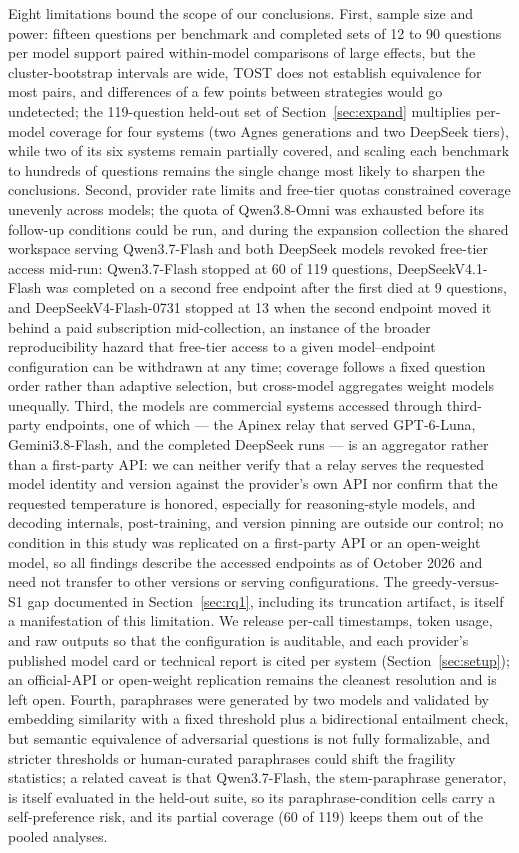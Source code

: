 Eight limitations bound the scope of our conclusions. First, sample size and power: fifteen questions per benchmark and completed sets of 12 to 90 questions per model support paired within-model comparisons of large effects, but the cluster-bootstrap intervals are wide, TOST does not establish equivalence for most pairs, and differences of a few points between strategies would go undetected; the 119-question held-out set of Section~\ref{sec:expand} multiplies per-model coverage for four systems (two Agnes generations and two DeepSeek tiers), while two of its six systems remain partially covered, and scaling each benchmark to hundreds of questions remains the single change most likely to sharpen the conclusions. Second, provider rate limits and free-tier quotas constrained coverage unevenly across models; the quota of Qwen3.8-Omni was exhausted before its follow-up conditions could be run, and during the expansion collection the shared workspace serving Qwen3.7-Flash and both DeepSeek models revoked free-tier access mid-run: Qwen3.7-Flash stopped at 60 of 119 questions, DeepSeekV4.1-Flash was completed on a second free endpoint after the first died at 9 questions, and DeepSeekV4-Flash-0731 stopped at 13 when the second endpoint moved it behind a paid subscription mid-collection, an instance of the broader reproducibility hazard that free-tier access to a given model--endpoint configuration can be withdrawn at any time; coverage follows a fixed question order rather than adaptive selection, but cross-model aggregates weight models unequally. Third, the models are commercial systems accessed through third-party endpoints, one of which --- the Apinex relay that served GPT-6-Luna, Gemini3.8-Flash, and the completed DeepSeek runs --- is an aggregator rather than a first-party API: we can neither verify that a relay serves the requested model identity and version against the provider's own API nor confirm that the requested temperature is honored, especially for reasoning-style models, and decoding internals, post-training, and version pinning are outside our control; no condition in this study was replicated on a first-party API or an open-weight model, so all findings describe the accessed endpoints as of October 2026 and need not transfer to other versions or serving configurations. The greedy-versus-S1 gap documented in Section~\ref{sec:rq1}, including its truncation artifact, is itself a manifestation of this limitation. We release per-call timestamps, token usage, and raw outputs so that the configuration is auditable, and each provider's published model card or technical report is cited per system (Section~\ref{sec:setup}); an official-API or open-weight replication remains the cleanest resolution and is left open. Fourth, paraphrases were generated by two models and validated by embedding similarity with a fixed threshold plus a bidirectional entailment check, but semantic equivalence of adversarial questions is not fully formalizable, and stricter thresholds or human-curated paraphrases could shift the fragility statistics; a related caveat is that Qwen3.7-Flash, the stem-paraphrase generator, is itself evaluated in the held-out suite, so its paraphrase-condition cells carry a self-preference risk, and its partial coverage (60 of 119) keeps them out of the pooled analyses. 